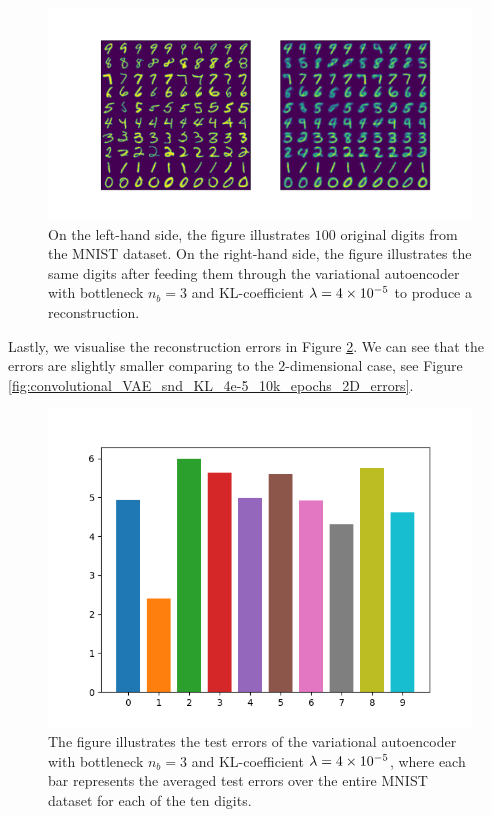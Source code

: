 \begin{figure}
\begin{center}
      \includegraphics[trim = 15mm 10mm 15mm 15mm, clip, width=\linewidth]{convolutional_VAE_snd_KL_4e-5_10k_epochs_3D_inference}
\end{center}
\caption{On the left-hand side, the figure illustrates $100$ original digits from the MNIST dataset. On the right-hand side, the figure illustrates the same digits after feeding them through the variational autoencoder with bottleneck $n_b=3$ and KL-coefficient $\lambda = \num{4e-5}$ to produce a reconstruction.}\label{fig:convolutional_VAE_snd_KL_4e-5_10k_epochs_3D_inference}
\end{figure}


Lastly, we visualise the reconstruction errors in Figure \ref{fig:convolutional_VAE_snd_KL_4e-5_10k_epochs_3D_errors}. We can see that the errors are slightly smaller comparing to the $2$-dimensional case, see Figure \ref{fig:convolutional_VAE_snd_KL_4e-5_10k_epochs_2D_errors}.



\begin{figure}
\begin{center}
      \includegraphics[width=0.49\linewidth]{convolutional_VAE_snd_KL_4e-5_10k_epochs_3D_errors}
\end{center}
\caption{The figure illustrates the test errors of the variational autoencoder with bottleneck $n_b=3$ and KL-coefficient $\lambda = \num{4e-5}$, where each bar represents the averaged test errors over the entire MNIST dataset for each of the ten digits.}\label{fig:convolutional_VAE_snd_KL_4e-5_10k_epochs_3D_errors}
\end{figure}


